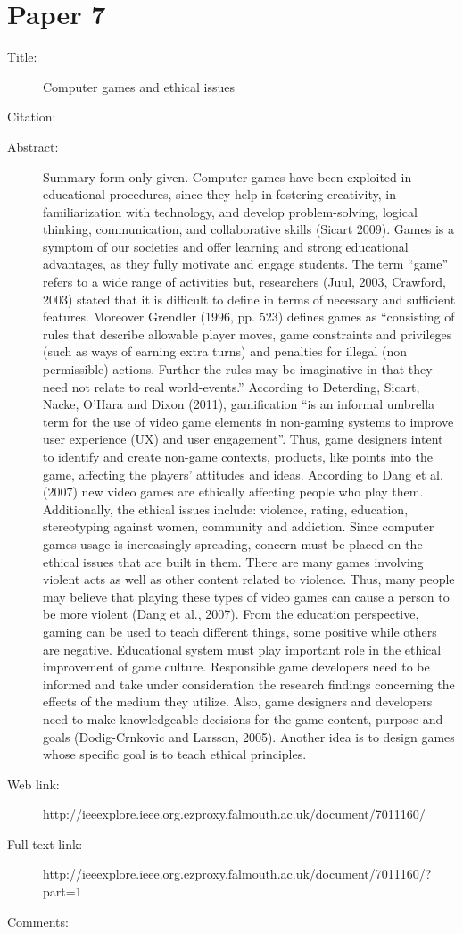 \documentclass{scrartcl}
\begin{document}
\section*{Paper 7}
\begin{description}
\item[Title:] Computer games and ethical issues
\item[Citation:] \cite{issues}
\item[Abstract:] Summary form only given. Computer games have been exploited in educational procedures, since they help in fostering creativity, in familiarization with technology, and develop problem-solving, logical thinking, communication, and collaborative skills (Sicart 2009). Games is a symptom of our societies and offer learning and strong educational advantages, as they fully motivate and engage students. The term “game” refers to a wide range of activities but, researchers (Juul, 2003, Crawford, 2003) stated that it is difficult to define in terms of necessary and sufficient features. Moreover Grendler (1996, pp. 523) defines games as “consisting of rules that describe allowable player moves, game constraints and privileges (such as ways of earning extra turns) and penalties for illegal (non permissible) actions. Further the rules may be imaginative in that they need not relate to real world-events.” According to Deterding, Sicart, Nacke, O'Hara and Dixon (2011), gamification “is an informal umbrella term for the use of video game elements in non-gaming systems to improve user experience (UX) and user engagement”. Thus, game designers intent to identify and create non-game contexts, products, like points into the game, affecting the players' attitudes and ideas. According to Dang et al. (2007) new video games are ethically affecting people who play them. Additionally, the ethical issues include: violence, rating, education, stereotyping against women, community and addiction. Since computer games usage is increasingly spreading, concern must be placed on the ethical issues that are built in them. There are many games involving violent acts as well as other content related to violence. Thus, many people may believe that playing these types of video games can cause a person to be more violent (Dang et al., 2007). From the education perspective, gaming can be used to teach different things, some positive while others are negative. Educational system must play important role in the ethical improvement of game culture. Responsible game developers need to be informed and take under consideration the research findings concerning the effects of the medium they utilize. Also, game designers and developers need to make knowledgeable decisions for the game content, purpose and goals (Dodig-Crnkovic and Larsson, 2005). Another idea is to design games whose specific goal is to teach ethical principles.
\item[Web link:] http://ieeexplore.ieee.org.ezproxy.falmouth.ac.uk/document/7011160/
\item[Full text link:] http://ieeexplore.ieee.org.ezproxy.falmouth.ac.uk/document/7011160/?part=1
\item[Comments:]  
\end{description}
\end{document}
